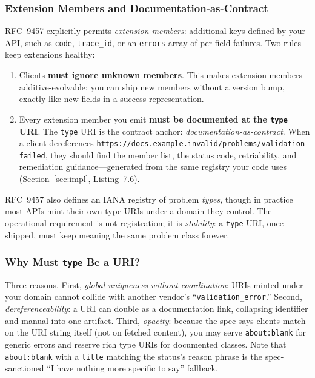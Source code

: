 \subsubsection{Extension Members and Documentation-as-Contract}

RFC~9457 explicitly permits \emph{extension members}: additional keys defined
by your API, such as \texttt{code}, \texttt{trace\_id}, or an
\texttt{errors} array of per-field failures. Two rules keep extensions
healthy:

\begin{enumerate}
  \item Clients \textbf{must ignore unknown members}. This makes extension
        members additive-evolvable: you can ship new members without a
        version bump, exactly like new fields in a success representation.
  \item Every extension member you emit \textbf{must be documented at the
        \texttt{type} URI}. The \texttt{type} URI is the contract anchor:
        \emph{documentation-as-contract}. When a client dereferences
        \texttt{https://docs.example.invalid/problems/validation-failed},
        they should find the member list, the status code, retriability, and
        remediation guidance---generated from the same registry your code
        uses (Section~\ref{sec:impl}, Listing~7.6).
\end{enumerate}

RFC~9457 also defines an IANA registry of problem \emph{types}, though in
practice most APIs mint their own type URIs under a domain they control. The
operational requirement is not registration; it is \emph{stability}: a
\texttt{type} URI, once shipped, must keep meaning the same problem class
forever.

\subsubsection{Why Must \texttt{type} Be a URI?}

Three reasons. First, \emph{global uniqueness without coordination}: URIs
minted under your domain cannot collide with another vendor's
``\texttt{validation\_error}.'' Second, \emph{dereferenceability}: a URI can
double as a documentation link, collapsing identifier and manual into one
artifact. Third, \emph{opacity}: because the spec says clients match on the
URI string itself (not on fetched content), you may serve
\texttt{about:blank} for generic errors and reserve rich type URIs for
documented classes. Note that \texttt{about:blank} with a \texttt{title}
matching the status's reason phrase is the spec-sanctioned ``I have nothing
more specific to say'' fallback.

